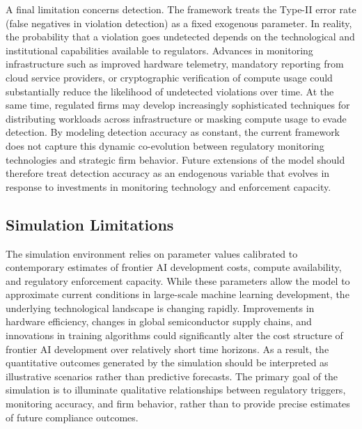 A final limitation concerns detection. The framework treats the Type-II error rate (false negatives in violation detection) as a fixed exogenous parameter. In reality, the probability that a violation goes undetected depends on the technological and institutional capabilities available to regulators. Advances in monitoring infrastructure such as improved hardware telemetry, mandatory reporting from cloud service providers, or cryptographic verification of compute usage could substantially reduce the likelihood of undetected violations over time. At the same time, regulated firms may develop increasingly sophisticated techniques for distributing workloads across infrastructure or masking compute usage to evade detection. By modeling detection accuracy as constant, the current framework does not capture this dynamic co-evolution between regulatory monitoring technologies and strategic firm behavior. Future extensions of the model should therefore treat detection accuracy as an endogenous variable that evolves in response to investments in monitoring technology and enforcement capacity.

\subsection{Simulation Limitations}
The simulation environment relies on parameter values calibrated to contemporary estimates of frontier AI development costs, compute availability, and regulatory enforcement capacity. While these parameters allow the model to approximate current conditions in large-scale machine learning development, the underlying technological landscape is changing rapidly. Improvements in hardware efficiency, changes in global semiconductor supply chains, and innovations in training algorithms could significantly alter the cost structure of frontier AI development over relatively short time horizons. As a result, the quantitative outcomes generated by the simulation should be interpreted as illustrative scenarios rather than predictive forecasts. The primary goal of the simulation is to illuminate qualitative relationships between regulatory triggers, monitoring accuracy, and firm behavior, rather than to provide precise estimates of future compliance outcomes.

